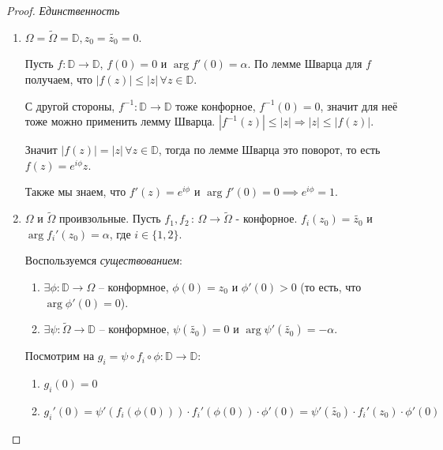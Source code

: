 \begin{proof}
    \textit{Единственность}

    \begin{enumerate}
        \item {
            $\Omega = \tilde{\Omega} = \mathbb{D}, z_0 = \tilde{z_0} = 0$.

            Пусть $f : \mathbb{D} \to \mathbb{D}$, $f(0) = 0$ и $\arg f'(0) = \alpha$.
            По лемме Шварца для $f$ получаем, что $|f(z)| \leqslant |z| \, \forall z \in \mathbb{D}$.

            С другой стороны, $f^{-1} : \mathbb{D} \to \mathbb{D}$ тоже конфорное, $f^{-1}(0) = 0$, значит для
            неё тоже можно применить лемму Шварца. $|f^{-1}(z)| \leqslant |z| \Rightarrow |z| \leqslant |f(z)|$.

            Значит $|f(z)| = |z| \, \forall z \in \mathbb{D}$, тогда по лемме Шварца это поворот, то есть $f(z) = e^{i\phi}z$.

            Также мы знаем, что $f'(z) = e^{i\phi}$ и $\arg f'(0) = 0 \implies e^{i\phi} = 1$.
        }
        \item {
            $\Omega$ и $\tilde{\Omega}$ проивзольные. Пусть $f_1, f_2 \, : \, \Omega \to \tilde{\Omega}$ - конфорное.
            $f_i(z_0) = \tilde{z_0}$ и $\arg f_i' (z_0) = \alpha$, где $i \in \{1, 2\}$.

            Воспользуемся \textit{существованием}:

            \begin{enumerate}
                \item {
                    $\exists \phi : \mathbb{D} \rightarrow \Omega$ -- конформное, $\phi(0) = z_0$ и $\phi'(0) > 0$ (то есть, что $\arg \phi'(0) = 0$).
                }
                \item {
                    $\exists \psi : \tilde{\Omega} \rightarrow \mathbb{D}$ -- конформное, $\psi(\tilde{z_0}) = 0$ и $\arg \psi'(\tilde{z_0}) = -\alpha$.
                }
            \end{enumerate}

            Посмотрим на $g_i = \psi \circ f_i \circ \phi: \mathbb{D} \rightarrow \mathbb{D}$:

            \begin{enumerate}
                \item $g_i(0) = 0$
                \item {
                    $g_i'(0) = \psi'(f_i(\phi(0))) \cdot f_i'(\phi(0)) \cdot \phi'(0) = \psi'(\tilde{z_0}) \cdot f_i'(z_0) \cdot\phi'(0)$

}
\end{enumerate}}
\end{enumerate}
\end{proof}
